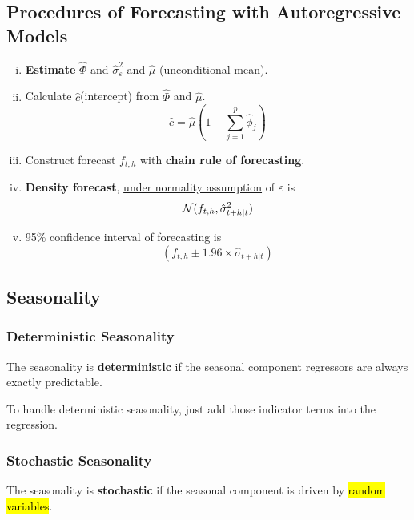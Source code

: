 \documentclass[11pt]{article}
\begin{document}
		\subsection{Procedures of Forecasting with Autoregressive Models}
			\begin{enumerate}[(i)]
				\item \textbf{Estimate} $\hat{\Phi}$ and $\hat{\sigma}_\varepsilon^2$ and $\hat{\mu}$ (unconditional mean). 
				\item Calculate $\hat{c}$(intercept) from $\hat{\Phi}$ and $\hat{\mu}$.
					\begin{equation}
						\hat{c} = \hat{\mu}(1 - \sum_{j=1}^p \hat{\phi}_j)
					\end{equation}
				\item Construct forecast $f_{t, h}$ with \textbf{chain rule of forecasting}.
				\item \textbf{Density forecast}, \ul{under normality assumption} of $\varepsilon$ is
				\begin{equation}
					\mathcal{{N}}(f_{t,h}, \hat{\sigma}^2_{t+h|t})
				\end{equation}
				\item 95\% confidence interval of forecasting is
				\begin{equation}
					(f_{t,h} \pm 1.96 \times \hat{\sigma}_{t+h|t})
				\end{equation}
			\end{enumerate}
		
		\subsection{Seasonality}
			\subsubsection{Deterministic Seasonality}
				\begin{definition}
					The seasonality is \textbf{deterministic} if the seasonal component regressors are always exactly predictable.
				\end{definition}
				
				\begin{remark}
					To handle deterministic seasonality, just add those indicator terms into the regression.
				\end{remark}
				
			\subsubsection{Stochastic Seasonality}
				\begin{definition}
					The seasonality is \textbf{stochastic} if the seasonal component is driven by \hl{random variables}.
				\end{definition}
				
\end{document}
